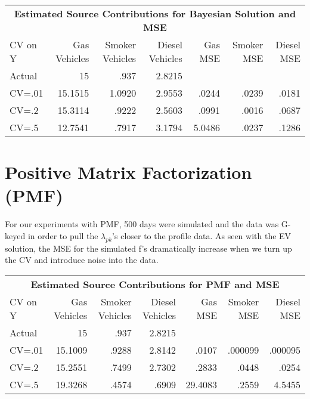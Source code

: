 \documentclass{report}
\begin{document}
\begin{center}
\begin{tabular}{l | r | r | r|  r |  r | r }
\multicolumn{7}{c}{\textbf{Estimated Source Contributions for Bayesian Solution and MSE}}\\
CV on Y & Gas Vehicles & Smoker Vehicles & Diesel Vehicles & Gas MSE & Smoker MSE & Diesel MSE\\ \hline
Actual                      & 15 & .937 & 2.8215 &  &  &  \\ 
CV=.01                    & 15.1515 & 1.0920 & 2.9553 & .0244 & .0239 & .0181\\
CV=.2                      & 15.3114 & .9222  & 2.5603 & .0991 & .0016 &  .0687\\
CV=.5                      & 12.7541 & .7917 & 3.1794 & 5.0486 & .0237 & .1286\\
\end{tabular}
\end{center}

\section*{Positive Matrix Factorization (PMF)}
 For our experiments with PMF, 500 days were simulated and the data was G-keyed in order to pull the $\lambda_{pk}$'s closer to the profile data.  As seen with the EV solution, the MSE for the simulated f's dramatically increase when we turn up the CV and introduce noise into the data.  

\begin{center}
\begin{tabular}{l | r | r | r|  r |  r | r }
\multicolumn{7}{c}{\textbf{Estimated Source Contributions for PMF and MSE}}\\
CV on Y & Gas Vehicles & Smoker Vehicles & Diesel Vehicles & Gas MSE & Smoker MSE & Diesel MSE\\ \hline
Actual                      & 15 & .937 & 2.8215 &  &  &  \\ 
CV=.01                    & 15.1009 & .9288 & 2.8142 & .0107 & .000099 & .000095\\
CV=.2                      & 15.2551 & .7499 & 2.7302 & .2833 & .0448 & .0254\\
CV=.5                      & 19.3268 & .4574 & .6909 & 29.4083 & .2559 & 4.5455\\
\end{tabular}
\end{center}
\end{document}
